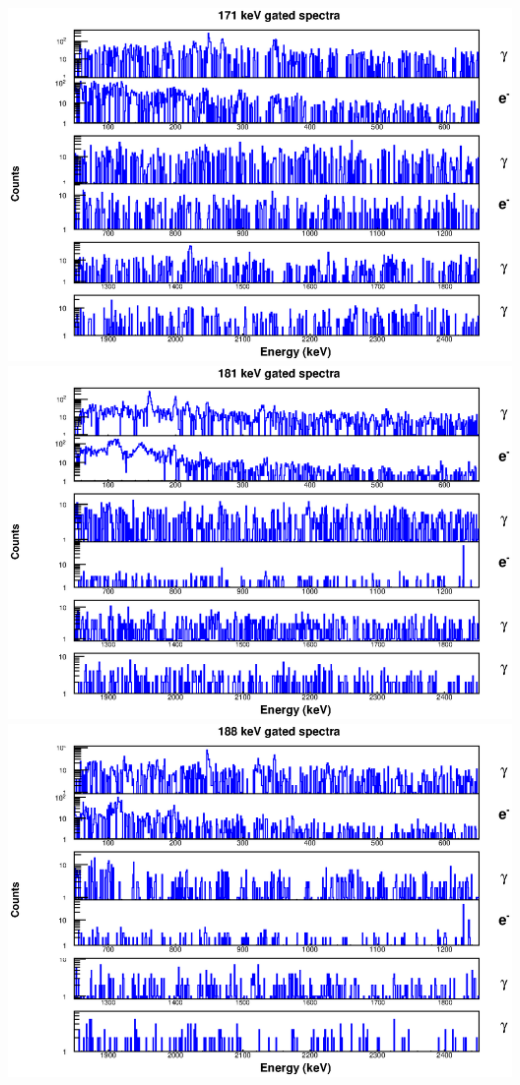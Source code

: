 \includegraphics[scale=0.8]{154Gd_Appendix/171_combined.eps}
\includegraphics[scale=0.8]{154Gd_Appendix/181_combined.eps}
\includegraphics[scale=0.8]{154Gd_Appendix/188_combined.eps}
